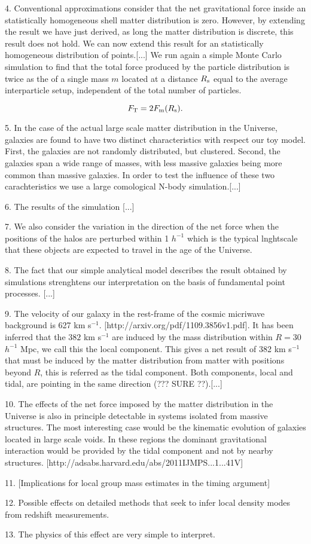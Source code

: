 \documentclass{article}
\begin{document}
4. Conventional approximations consider that the net gravitational force
inside an statistically homogeneous shell matter distribution is
zero. However, by extending the result we have just derived, as long
the matter distribution is discrete, this result does not hold. We can
now extend this result for an statistically homogeneous distribution
of points.[...] We run again a simple Monte Carlo simulation to find
that the total force produced by the particle distribution is twice as
the of a single mass $m$ located at a distance $R_{\rm s}$ equal to
the average interparticle setup, independent of the total number of
particles. 

\begin{equation}
F_{\rm T} = 2 F_{\rm m}(R_{\rm s}).
\end{equation}

5. In the case of the actual large scale matter distribution in the
Universe, galaxies are found to have two distinct characteristics with
respect our toy model. First, the galaxies are not randomly
distributed, but clustered. Second, the galaxies span a wide range of
masses, with less massive galaxies being more common than massive
galaxies. In order to test the influence of these two carachteristics
we use a large comological N-body simulation.[...]

6. The results of the simulation [...] 

7. We also consider the variation in the direction of the net force
when the positions of the halos are perturbed within 1 $h^{-1}$ which
is the typical lnghtscale that these objects are expected to travel in
the age of the Universe.


8. The fact that our simple analytical model describes the result
obtained by simulations strenghtens our interpretation on the basis of
fundamental point processes. [...]

9. The velocity of our galaxy in the rest-frame of the cosmic
micriwave background is 627 km
s$^{-1}$. [http://arxiv.org/pdf/1109.3856v1.pdf]. It has been inferred
that the $382$ km s$^{-1}$ are induced by the mass distribution within
$R=30$ $h^{-1}$ Mpc, we call this the local component. This gives a
net result of 382 km s$^{-1}$ that must be induced by the matter
distribution from matter with positions beyond $R$, this is referred
as the tidal component.  Both components, local and tidal, are
pointing in the same direction (??? SURE ??).[...]

10. The effects of the net force imposed by the matter distribution
in the Universe is also in principle detectable in systems isolated 
from massive structures. The most interesting case would be the
kinematic evolution of galaxies located in large scale voids. In these
regions the dominant gravitational interaction would be provided by
the tidal component and not by nearby
structures. [http://adsabs.harvard.edu/abs/2011IJMPS...1...41V] 

11. [Implications for local group mass estimates in the timing argument]

12. Possible effects on detailed methods that seek to infer local
density modes from redshift measurements. 

13. The physics of this effect are very simple to interpret.
\end{document}

